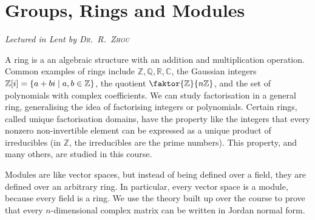 \chapter[Groups, Rings and Modules \\ \textnormal{\emph{Lectured in Lent \oldstylenums{2022} by \textsc{Dr.\ R.\ Zhou}}}]{Groups, Rings and Modules}
\emph{\Large Lectured in Lent  by \textsc{Dr.\ R.\ Zhou}}

A ring is a an algebraic structure with an addition and multiplication operation.
Common examples of rings include \( \mathbb Z, \mathbb Q, \mathbb R, \mathbb C \), the Gaussian integers \( \mathbb Z[i] = \qty{a + bi \mid a, b \in \mathbb Z} \), the quotient \( \faktor{\mathbb Z}{n\mathbb Z} \), and the set of polynomials with complex coefficients.
We can study factorisation in a general ring, generalising the idea of factorising integers or polynomials.
Certain rings, called unique factorisation domains, have the property like the integers that every nonzero non-invertible element can be expressed as a unique product of irreducibles (in \( \mathbb Z \), the irreducibles are the prime numbers).
This property, and many others, are studied in this course.

Modules are like vector spaces, but instead of being defined over a field, they are defined over an arbitrary ring.
In particular, every vector space is a module, because every field is a ring.
We use the theory built up over the course to prove that every \( n \)-dimensional complex matrix can be written in Jordan normal form.


